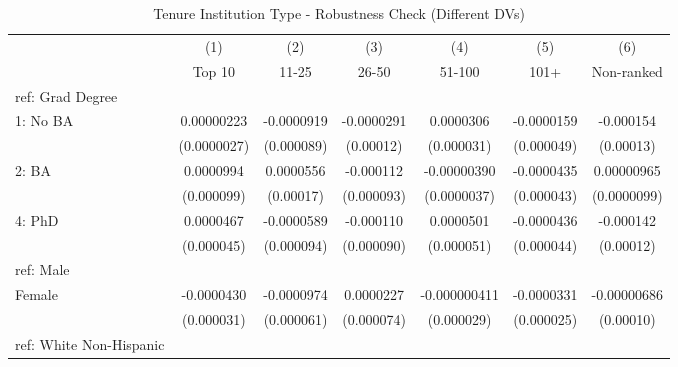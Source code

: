 \begin{table}[htbp]\centering
\def\sym#1{\ifmmode^{#1}\else\(^{#1}\)\fi}
\caption{Tenure Institution Type - Robustness Check (Different DVs) \label{tab1}}
\begin{tabular}{l*{6}{c}}
\hline\hline
  &\multicolumn{1}{c}{(1)}&\multicolumn{1}{c}{(2)}&\multicolumn{1}{c}{(3)}&\multicolumn{1}{c}{(4)}&\multicolumn{1}{c}{(5)}&\multicolumn{1}{c}{(6)}\\
  &\multicolumn{1}{c}{Top 10}&\multicolumn{1}{c}{11-25}&\multicolumn{1}{c}{26-50}&\multicolumn{1}{c}{51-100}&\multicolumn{1}{c}{101+}&\multicolumn{1}{c}{Non-ranked}\\
\hline
ref: Grad Degree&                     &                     &                     &                     &                     &                     \\
[1em]
1: No BA&  0.00000223         &  -0.0000919         &  -0.0000291         &   0.0000306         &  -0.0000159         &   -0.000154         \\
  & (0.0000027)         &  (0.000089)         &   (0.00012)         &  (0.000031)         &  (0.000049)         &   (0.00013)         \\
[1em]
2: BA&   0.0000994         &   0.0000556         &   -0.000112         & -0.00000390         &  -0.0000435         &  0.00000965         \\
  &  (0.000099)         &   (0.00017)         &  (0.000093)         & (0.0000037)         &  (0.000043)         & (0.0000099)         \\
[1em]
4: PhD&   0.0000467         &  -0.0000589         &   -0.000110         &   0.0000501         &  -0.0000436         &   -0.000142         \\
  &  (0.000045)         &  (0.000094)         &  (0.000090)         &  (0.000051)         &  (0.000044)         &   (0.00012)         \\
[1em]
ref: Male&                     &                     &                     &                     &                     &                     \\
[1em]
Female&  -0.0000430         &  -0.0000974         &   0.0000227         &-0.000000411         &  -0.0000331         & -0.00000686         \\
  &  (0.000031)         &  (0.000061)         &  (0.000074)         &  (0.000029)         &  (0.000025)         &   (0.00010)         \\
[1em]
ref: White Non-Hispanic&                     &                     &                     &                     &                     &                     \\

\end{tabular}
\end{table}
